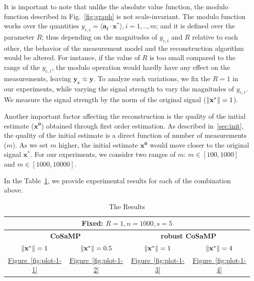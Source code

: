 It is important to note that unlike the absolute value function, the modulo function described in Fig.~\ref{fig:graph} is not scale-invariant. The modulo function works over the quantities $y_{c,i}=\langle \mathbf{a_i} \cdot \mathbf{x^*} \rangle, i=1,..,m$; and it is defined over the parameter $R$; thus depending on the magnitudes of $y_{c,i}$ and $R$ relative to each other, the behavior of the measurement model and the reconstruction algorithm would be altered. For instance, if the value of $R$ is too small compared to the range of the $y_{c,i}$, the modulo operation would hardly have any effect on the measurements, leaving $\mathbf{y_c \approx y}$. To analyze such variations, we fix the $R =1$ in our experiments, while varying the signal strength to vary the magnitudes of $y_{c,i}$. We measure the signal strength by the norm of the original signal ($\|\mathbf{{x}^*}\|=1$).

Another important factor affecting the reconstruction is the quality of the initial estimate ($\mathbf{{x}^0}$) obtained through first order estimation. As described in~\ref{sec:init}, the quality of the initial estimate is a direct function of number of measurements ($m$). As we set $m$ higher, the initial estimate $\mathbf{{x}^0}$ would move closer to the original signal $\mathbf{{x}^*}$. For our experiments, we consider two ranges of $m$: $m \in [100,1000]$ and $m \in [1000,10000]$.

In the Table~\ref{Tab2}, we provide experimental results for each of the combination above.
\begin{center}
	\begin{table}
		\centering
		\begin{tabular}{cccc}\toprule
			\multicolumn{4}{c}{\small{\textbf{Fixed:} $R=1, n=1000, s=5$}} \\ \midrule
			\multicolumn{2}{c}{\textbf{CoSaMP}}&\multicolumn{2}{c}{\textbf{robust CoSaMP}}
			\\\cmidrule(r){1-2}\cmidrule(r){3-4}  
			\small{$\|\mathbf{{x}^*}\|=1$}&\small{$\|\mathbf{{x}^*}\|=0.5$}&\small{$\|\mathbf{{x}^*}\|=1$}&\small{$\|\mathbf{{x}^*}\|=4$}\\\midrule
			\hyperref[fig:plot-1-1]{Figure~\ref{fig:plot-1-1}} & \hyperref[fig:plot-1-2]{Figure~\ref{fig:plot-1-2}}
			& \hyperref[fig:plot-1-3]{Figure~\ref{fig:plot-1-3}}  & \hyperref[fig:plot-1-4]{Figure~\ref{fig:plot-1-4}} \\
			 \bottomrule
		\end{tabular}
		\caption{The Results}\label{Tab2}
	\end{table} 	
\end{center}
 
